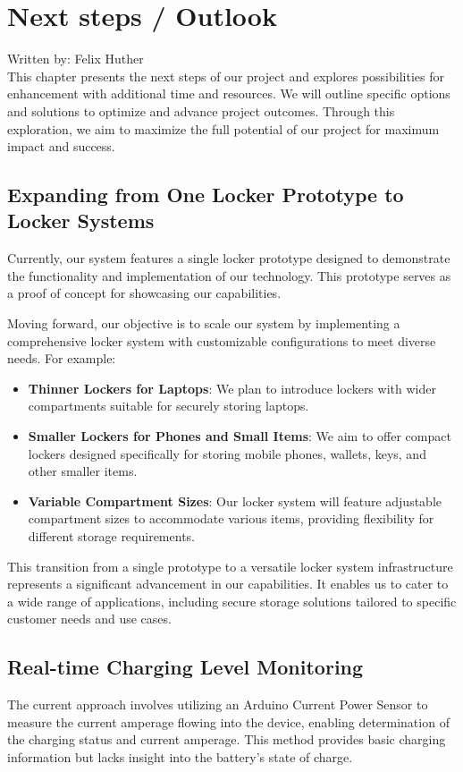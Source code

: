 \section{Next steps / Outlook}
{\tiny Written by: Felix Huther}\\ 

This chapter presents the next steps of our project and explores possibilities 
for enhancement with additional time and resources. 
We will outline specific options and solutions to optimize and advance project outcomes. 
Through this exploration, we aim to maximize the full potential of our project 
for maximum impact and success.

\subsection{Expanding from One Locker Prototype to Locker Systems}

Currently, our system features a single locker prototype designed to demonstrate the functionality and implementation of our technology. This prototype serves as a proof of concept for showcasing our capabilities.

Moving forward, our objective is to scale our system by implementing a comprehensive locker system with customizable configurations to meet diverse needs. For example:

\begin{itemize}
    \item \textbf{Thinner Lockers for Laptops}: We plan to introduce lockers with wider compartments suitable for securely storing laptops.
    \item \textbf{Smaller Lockers for Phones and Small Items}: We aim to offer compact lockers designed specifically for storing mobile phones, wallets, keys, and other smaller items.
    \item \textbf{Variable Compartment Sizes}: Our locker system will feature adjustable compartment sizes to accommodate various items, providing flexibility for different storage requirements.
\end{itemize}

This transition from a single prototype to a versatile locker system infrastructure represents a significant advancement in our capabilities. It enables us to cater to a wide range of applications, including secure storage solutions tailored to specific customer needs and use cases.


\subsection{Real-time Charging Level Monitoring}
The current approach involves utilizing an Arduino Current Power Sensor to measure the
current amperage flowing into the device, 
enabling determination of the charging status and current amperage. 
This method provides basic charging information but lacks insight into the battery's state of charge.

